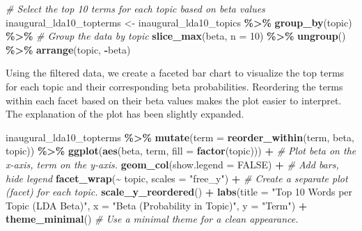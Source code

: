\documentclass[
]{book}
\newenvironment{Shaded}{\begin{snugshade}}{\end{snugshade}}
\newcommand{\AttributeTok}[1]{\textcolor[rgb]{0.13,0.29,0.53}{#1}}
\newcommand{\CommentTok}[1]{\textcolor[rgb]{0.56,0.35,0.01}{\textit{#1}}}
\newcommand{\ConstantTok}[1]{\textcolor[rgb]{0.56,0.35,0.01}{#1}}
\newcommand{\DecValTok}[1]{\textcolor[rgb]{0.00,0.00,0.81}{#1}}
\newcommand{\FunctionTok}[1]{\textcolor[rgb]{0.13,0.29,0.53}{\textbf{#1}}}
\newcommand{\NormalTok}[1]{#1}
\newcommand{\OtherTok}[1]{\textcolor[rgb]{0.56,0.35,0.01}{#1}}
\newcommand{\SpecialCharTok}[1]{\textcolor[rgb]{0.81,0.36,0.00}{\textbf{#1}}}
\newcommand{\StringTok}[1]{\textcolor[rgb]{0.31,0.60,0.02}{#1}}
\begin{document}
\begin{Shaded}
\begin{Highlighting}[]
\CommentTok{\# Select the top 10 terms for each topic based on beta values}
\NormalTok{inaugural\_lda10\_topterms }\OtherTok{\textless{}{-}}\NormalTok{ inaugural\_lda10\_topics }\SpecialCharTok{\%\textgreater{}\%}
  \FunctionTok{group\_by}\NormalTok{(topic) }\SpecialCharTok{\%\textgreater{}\%}          \CommentTok{\# Group the data by topic}
  \FunctionTok{slice\_max}\NormalTok{(beta, }\AttributeTok{n =} \DecValTok{10}\NormalTok{) }\SpecialCharTok{\%\textgreater{}\%} 
  \FunctionTok{ungroup}\NormalTok{() }\SpecialCharTok{\%\textgreater{}\%}                
  \FunctionTok{arrange}\NormalTok{(topic, }\SpecialCharTok{{-}}\NormalTok{beta)        }
\end{Highlighting}
\end{Shaded}

Using the filtered data, we create a faceted bar chart to visualize the top terms for each topic and their corresponding beta probabilities.
Reordering the terms within each facet based on their beta values makes the plot easier to interpret.
The explanation of the plot has been slightly expanded.

\begin{Shaded}
\begin{Highlighting}[]
\NormalTok{inaugural\_lda10\_topterms }\SpecialCharTok{\%\textgreater{}\%}
  \FunctionTok{mutate}\NormalTok{(}\AttributeTok{term =} \FunctionTok{reorder\_within}\NormalTok{(term, beta, topic)) }\SpecialCharTok{\%\textgreater{}\%} 
  \FunctionTok{ggplot}\NormalTok{(}\FunctionTok{aes}\NormalTok{(beta, term, }\AttributeTok{fill =} \FunctionTok{factor}\NormalTok{(topic))) }\SpecialCharTok{+}      \CommentTok{\# Plot beta on the x{-}axis, term on the y{-}axis.}
  \FunctionTok{geom\_col}\NormalTok{(}\AttributeTok{show.legend =} \ConstantTok{FALSE}\NormalTok{) }\SpecialCharTok{+}                      \CommentTok{\# Add bars, hide legend}
  \FunctionTok{facet\_wrap}\NormalTok{(}\SpecialCharTok{\textasciitilde{}}\NormalTok{ topic, }\AttributeTok{scales =} \StringTok{"free\_y"}\NormalTok{) }\SpecialCharTok{+}             \CommentTok{\# Create a separate plot (facet) for each topic. }
  \FunctionTok{scale\_y\_reordered}\NormalTok{() }\SpecialCharTok{+}      
  \FunctionTok{labs}\NormalTok{(}\AttributeTok{title =} \StringTok{"Top 10 Words per Topic (LDA Beta)"}\NormalTok{,     }
       \AttributeTok{x =} \StringTok{"Beta (Probability in Topic)"}\NormalTok{,}
       \AttributeTok{y =} \StringTok{"Term"}\NormalTok{) }\SpecialCharTok{+}
  \FunctionTok{theme\_minimal}\NormalTok{() }\CommentTok{\# Use a minimal theme for a clean appearance.}
\end{Highlighting}
\end{Shaded}
\end{document}
